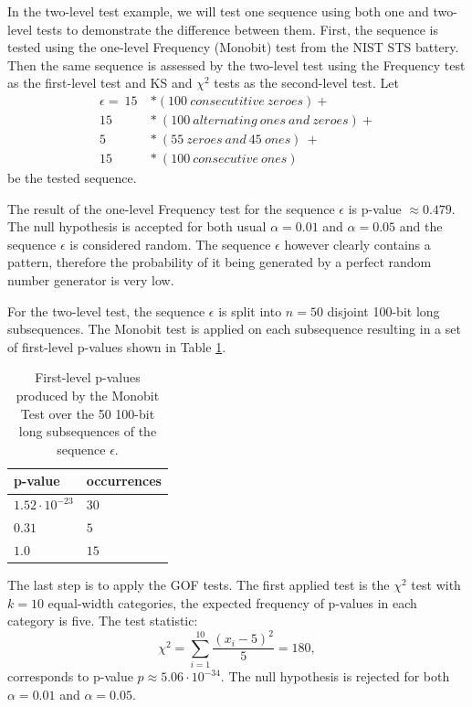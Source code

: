 \documentclass[
  digital,     %
  oneside,     %
  nosansbold,  %
  nocolorbold, %
  nolof,         %
  nolot,         %
]{fithesis4}
\begin{document}
In the two-level test example, we will test one sequence using both one and two-level tests to demonstrate the difference between them. First, the sequence is tested using the one-level Frequency (Monobit) test from the NIST STS battery.\cite[p. 2-2]{nist_special} Then the same sequence is assessed by the two-level test using the Frequency test as the first-level test and KS and $\chi^2$ tests as the second-level test. Let
\[\begin{split}
    \epsilon =\:15\: &* (100\:consecutitive\:zeroes) + \\
    15\:&*\:(100\:alternating\:ones\:and\:zeroes) + \\
    5\:&*\:(55\:zeroes\:and\:45\:ones)\:+\:\\
    15\:&*\:(100\:consecutive\:ones)
\end{split}\]
be the tested sequence. 

The result of the one-level Frequency test for the sequence $\epsilon$ is p-value $\approx 0.479$. The null hypothesis is accepted for both usual $\alpha = 0.01$ and $\alpha = 0.05$ and the sequence $\epsilon$ is considered random. The sequence $\epsilon$ however clearly contains a pattern, therefore the probability of it being generated by a perfect random number generator is very low.

For the two-level test, the sequence $\epsilon$ is split into $n=50$ disjoint 100-bit long subsequences. The Monobit test is applied on each subsequence resulting in a set of first-level p-values shown in Table \ref{tab:first_pvalues}.

\begin{table}[h]
  \begin{tabularx}{0.4\textwidth}{ll}
    \toprule
    p-value & occurrences  \\
    \midrule
    $1.52 \cdot 10^{-23}$ & $30$\\
    $0.31$ & $5$\\
    $1.0$ & $15$\\
    \bottomrule
  \end{tabularx}
  \caption{First-level p-values produced by the Monobit Test over the 50 100-bit long subsequences of the sequence $\epsilon$.}
  \label{tab:first_pvalues}
\end{table}

The last step is to apply the GOF tests. The first applied test is the $\chi^2$ test with $k=10$ equal-width categories, the expected frequency of p-values in each category is five. The test statistic:
\[\chi^2 = \sum_{i=1}^{10} \dfrac{(x_i - 5)^2}{5} = 180,\]
corresponds to p-value $p\approx5.06\cdot10^{-34}$. The null hypothesis is rejected for both $\alpha = 0.01$ and $\alpha = 0.05$. 
\end{document}
